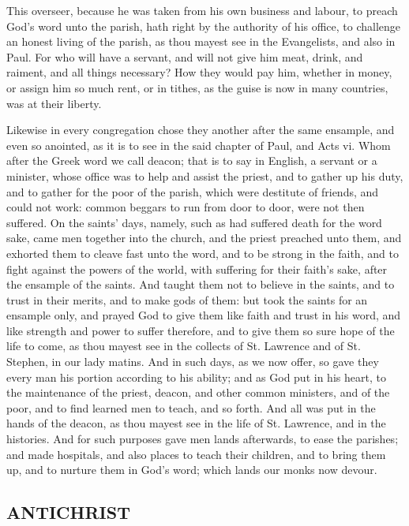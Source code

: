 This overseer, because he was taken from his own 
business and labour, to preach God's word unto the 
parish, hath right by the authority of his office, to challenge
an honest living of the parish, as thou mayest see 
in the Evangelists, and also in Paul. For who will have 
a servant, and will not give him meat, drink, and raiment, 
and all things necessary? How they would pay him, 
whether in money, or assign him so much rent, or in 
tithes, as the guise is now in many countries, was at their 
liberty. 

Likewise in every congregation chose they another after 
the same ensample, and even so anointed, as it is to see 
in the said chapter of Paul, and Acts vi. Whom after 
the Greek word we call deacon; that is to say in English, 
a servant or a minister, whose office was to help and assist
the priest, and to gather up his duty, and to gather for 
the poor of the parish, which were destitute of friends, 
and could not work: common beggars to run from door 
to door, were not then suffered. On the saints' days, 
namely, such as had suffered death for the word sake, 
came men together into the church, and the priest preached 
unto them, and exhorted them to cleave fast unto the word, 
and to be strong in the faith, and to fight against the 
powers of the world, with suffering for their faith's sake, 
after the ensample of the saints. And taught them not to 
believe in the saints, and to trust in their merits, and to 
make gods of them: but took the saints for an ensample 
only, and prayed God to give them like faith and trust 
in his word, and like strength and power to suffer therefore,
and to give them so sure hope of the life to come, as 
thou mayest see in the collects of St. Lawrence and of St. 
Stephen, in our lady matins. And in such days, as we 
now offer, so gave they every man his portion according 
to his ability; and as God put in his heart, to the maintenance
of the priest, deacon, and other common ministers,
and of the poor, and to find learned men to teach, 
and so forth. And all was put in the hands of the deacon, 
as thou mayest see in the life of St. Lawrence, and in the 
histories. And for such purposes gave men lands afterwards,
to ease the parishes; and made hospitals, and also 
places to teach their children, and to bring them up, and 
to nurture them in God's word; which lands our monks 
now devour. 


\subsection*{ANTICHRIST}

